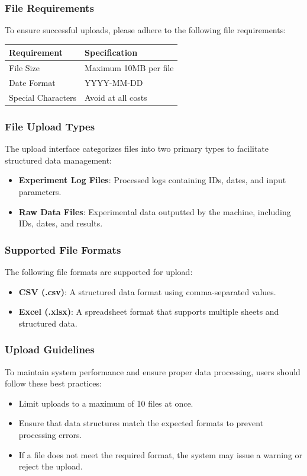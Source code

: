 \documentclass[12pt]{article}
\begin{document}
\subsubsection{File Requirements}
To ensure successful uploads, please adhere to the following file requirements:
\begin{table}[H]
    \centering
    \begin{tabularx}{\textwidth}{lX}
        \toprule
        \textbf{Requirement} & \textbf{Specification} \\
        \midrule
        File Size & Maximum 10MB per file \\
        Date Format & YYYY-MM-DD \\
        Special Characters & Avoid at all costs \\
        \bottomrule
    \end{tabularx}
\end{table}

\subsubsection{File Upload Types}
The upload interface categorizes files into two primary types to facilitate
structured data management:
\begin{itemize}
    \item \textbf{Experiment Log Files}: Processed logs containing IDs, dates,
    and input parameters.
    \item \textbf{Raw Data Files}: Experimental data outputted by the machine,
    including IDs, dates, and results.
\end{itemize}

\subsubsection{Supported File Formats}
The following file formats are supported for upload:
\begin{itemize}
    \item \textbf{CSV (.csv)}: A structured data format using comma-separated
    values.
    \item \textbf{Excel (.xlsx)}: A spreadsheet format that supports multiple
    sheets and structured data.
\end{itemize}

\subsubsection{Upload Guidelines}
To maintain system performance and ensure proper data processing, users should
follow these best practices:
\begin{itemize}
    \item Limit uploads to a maximum of 10 files at once.
    \item Ensure that data structures match the expected formats to prevent
    processing errors.
    \item If a file does not meet the required format, the system may issue a
    warning or reject the upload.
\end{itemize}
\end{document}
